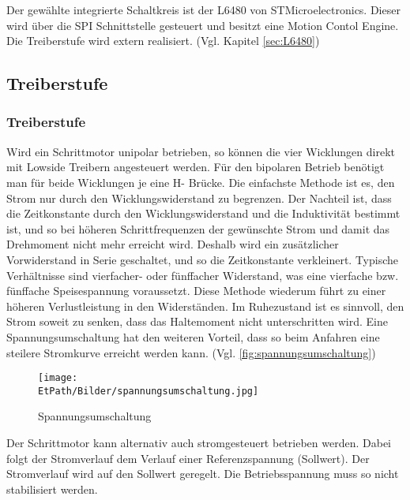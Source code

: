     Der gewählte integrierte Schaltkreis ist der L6480 von 
    STMicroelectronics. Dieser wird über die SPI Schnittstelle gesteuert 
    und besitzt eine Motion Contol Engine. Die Treiberstufe wird extern 
    realisiert. (Vgl. Kapitel \ref{sec:L6480}) 
    
\ifSTANDALONE
\subsection{Treiberstufe}
\fi
\ifEMBED
\subsubsection{Treiberstufe}
\fi 
	Wird ein Schrittmotor unipolar betrieben, so können die vier Wicklungen 
    direkt mit Lowside Treibern angesteuert werden. Für den bipolaren 
    Betrieb benötigt man für beide Wicklungen je eine H- Brücke. Die 
    einfachste Methode ist es, den Strom nur durch den Wicklungswiderstand 
    zu begrenzen. Der Nachteil ist, dass die Zeitkonstante durch den 
    Wicklungswiderstand und die Induktivität bestimmt ist, und so bei 
    höheren Schrittfrequenzen der gewünschte Strom und damit das 
    Drehmoment nicht mehr erreicht wird. Deshalb wird ein zusätzlicher 
    Vorwiderstand in Serie geschaltet, und so die Zeitkonstante 
    verkleinert. Typische Verhältnisse sind vierfacher- oder fünffacher 
    Widerstand, was eine vierfache bzw. fünffache Speisespannung 
    voraussetzt. Diese Methode wiederum führt zu einer höheren 
    Verlustleistung in den Widerständen. Im Ruhezustand ist es sinnvoll, 
    den Strom soweit zu senken, dass das Haltemoment nicht unterschritten 
    wird. Eine Spannungsumschaltung hat den weiteren Vorteil, dass so beim 
    Anfahren eine steilere Stromkurve erreicht werden kann. (Vgl. 
    \autoref{fig:spannungsumschaltung})
	 \begin{figure}[h!]
	 	\centering
	 	\texttt{[image: \\EtPath/Bilder/spannungsumschaltung.jpg]}
	 	\caption[Spannungsumschaltung]{Spannungsumschaltung \cite{AppNote:Stepper}}
	 	\label{fig:spannungsumschaltung}
	 \end{figure}
	Der Schrittmotor kann alternativ auch stromgesteuert betrieben werden. 
    Dabei folgt der Stromverlauf dem Verlauf einer Referenzspannung 
    (Sollwert). Der Stromverlauf wird auf den Sollwert geregelt. Die 
    Betriebsspannung muss so nicht stabilisiert werden. 
    \label{stromgesteuert} 

